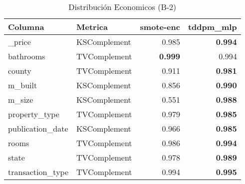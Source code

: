 \begin{table}[H]
\centering
\caption{Distribución Economicos (B-2)}
\label{table-shape-economicos-b-2}
\begin{tabular}{|l|l|r|r|}
\hline
\rowcolor[gray]{0.8}
Columna & Metrica & smote-enc & tddpm\_mlp \\
\hline \_price & KSComplement & 0.985 & \bfseries 0.994 \\
\hline bathrooms & TVComplement & \bfseries 0.999 & 0.994 \\
\hline county & TVComplement & 0.911 & \bfseries 0.981 \\
\hline m\_built & KSComplement & 0.856 & \bfseries 0.990 \\
\hline m\_size & KSComplement & 0.551 & \bfseries 0.988 \\
\hline property\_type & TVComplement & 0.979 & \bfseries 0.985 \\
\hline publication\_date & KSComplement & 0.966 & \bfseries 0.985 \\
\hline rooms & TVComplement & 0.986 & \bfseries 0.994 \\
\hline state & TVComplement & 0.978 & \bfseries 0.989 \\
\hline transaction\_type & TVComplement & 0.994 & \bfseries 0.995 \\
\hline
\end{tabular}
\end{table}
